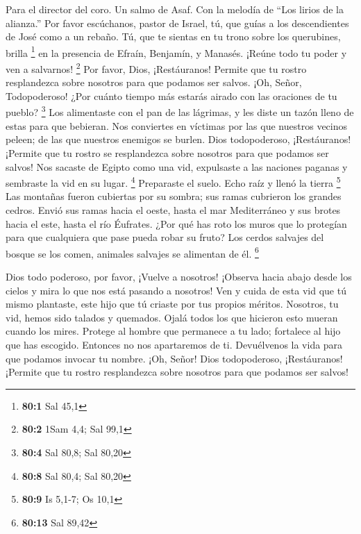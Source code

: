 Para el director del coro. Un salmo de Asaf. Con la melodía de ``Los
lirios de la alianza.''  Por favor escúchanos, pastor de
Israel, tú, que guías a los descendientes de José como a un rebaño. Tú,
que te sientas en tu trono sobre los querubines, brilla \footnote{\textbf{80:1}
  Sal 45,1}  en la presencia de Efraín, Benjamín, y Manasés.
¡Reúne todo tu poder y ven a salvarnos! \footnote{\textbf{80:2} 1Sam
  4,4; Sal 99,1}  Por favor, Dios, ¡Restáuranos! Permite que
tu rostro resplandezca sobre nosotros para que podamos ser salvos.
 ¡Oh, Señor, Todopoderoso! ¿Por cuánto tiempo más estarás
airado con las oraciones de tu pueblo? \footnote{\textbf{80:4} Sal 80,8;
  Sal 80,20}  Los alimentaste con el pan de las lágrimas, y
les diste un tazón lleno de estas para que bebieran.  Nos
conviertes en víctimas por las que nuestros vecinos peleen; de las que
nuestros enemigos se burlen.  Dios todopoderoso,
¡Restáuranos! ¡Permite que tu rostro se resplandezca sobre nosotros para
que podamos ser salvos!  Nos sacaste de Egipto como una vid,
expulsaste a las naciones paganas y sembraste la vid en su lugar.
\footnote{\textbf{80:8} Sal 80,4; Sal 80,20}  Preparaste el
suelo. Echo raíz y llenó la tierra \footnote{\textbf{80:9} Is 5,1-7; Os
  10,1}  Las montañas fueron cubiertas por su sombra; sus
ramas cubrieron los grandes cedros.  Envió sus ramas hacia
el oeste, hasta el mar Mediterráneo y sus brotes hacia el este, hasta el
río Éufrates.  ¿Por qué has roto los muros que lo protegían
para que cualquiera que pase pueda robar su fruto?  Los
cerdos salvajes del bosque se los comen, animales salvajes se alimentan
de él. \footnote{\textbf{80:13} Sal 89,42}

 Dios todo poderoso, por favor, ¡Vuelve a nosotros!
¡Observa hacia abajo desde los cielos y mira lo que nos está pasando a
nosotros! Ven y cuida de esta vid  que tú mismo plantaste,
este hijo que tú criaste por tus propios méritos. 
Nosotros, tu vid, hemos sido talados y quemados. Ojalá todos los que
hicieron esto mueran cuando los mires.  Protege al hombre
que permanece a tu lado; fortalece al hijo que has escogido.
 Entonces no nos apartaremos de ti. Devuélvenos la vida
para que podamos invocar tu nombre.  ¡Oh, Señor! Dios
todopoderoso, ¡Restáuranos! ¡Permite que tu rostro resplandezca sobre
nosotros para que podamos ser salvos!

